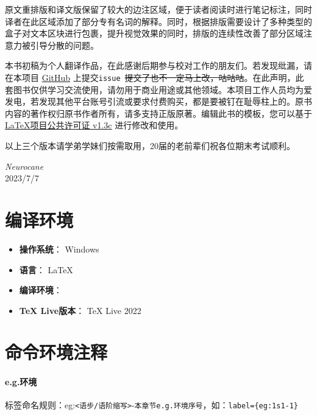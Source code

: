 \documentclass[a4paper]{ctexbook}
\begin{document}
原文重排版和译文版保留了较大的边注区域，便于读者阅读时进行笔记标注，同时译者在此区域添加了部分专有名词的解释。同时，根据排版需要设计了多种类型的盒子对文本区块进行包裹，提升视觉效果的同时，排版的连续性改善了部分区域注意力被引导分散的问题。

本书初稿为个人翻译作品，在此感谢后期参与校对工作的朋友们。若发现纰漏，请在本项目 \href{https://github.com/Neurocane/Abstract-Writing-for-Medical-Research-Papers}{GitHub} 上提交\verb|issue|~\sout{提交了也不一定马上改，咕咕咕}。在此声明，此套图书仅供学习交流使用，请勿用于商业用途或其他领域。本项目工作人员均为爱发电，若发现其他平台账号引流或要求付费购买，都是要被钉在耻辱柱上的。原书内容的著作权归原书作者所有，请多支持正版原著。编辑此书的模板，您可以基于 \href{https://www.latex-project.org/lppl/lppl-1-3c/}{\LaTeX 项目公共许可证 v1.3c} 进行修改和使用。

以上三个版本请学弟学妹们按需取用，20届的老前辈们祝各位期末考试顺利。

\vfill

\begin{flushright}
    \emph{Neurocane}\\
    2023/7/7
\end{flushright}

\newpage

\section*{编译环境}

\begin{itemize}
    \item \textbf{操作系统}： Windows
    \item \textbf{语言}： \LaTeX
    \item \textbf{编译环境}： \XeLaTeX
    \item \textbf{TeX Live版本}： TeX Live 2022
\end{itemize}

\section*{命令环境注释}

\paragraph*{e.g.环境} 标签命名规则：eg:\verb|<语步/语阶缩写>|-\verb|本章节e.g.环境序号|，如：\verb|label={eg:1s1-1}|

\tableofcontents
\end{document}
